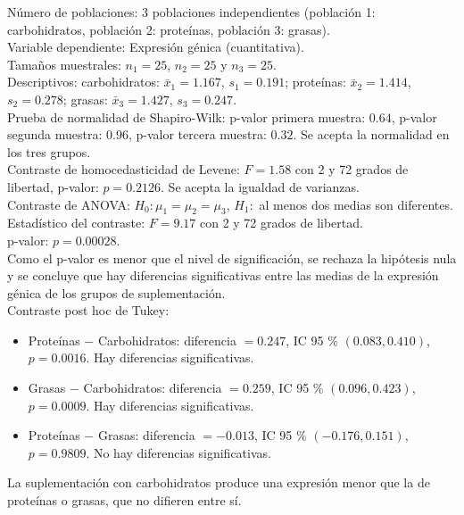 \documentclass[
  spanish,
  a4paper,
]{scrreport}
\providecommand{\tightlist}{%
  \setlength{\itemsep}{0pt}\setlength{\parskip}{0pt}}
\theoremstyle{definition}
\theoremstyle{remark}
\begin{document}
\begin{tcolorbox}[enhanced jigsaw, arc=.35mm, bottomrule=.15mm, bottomtitle=1mm, breakable, colback=white, colbacktitle=quarto-callout-tip-color!10!white, colframe=quarto-callout-tip-color-frame, coltitle=black, left=2mm, leftrule=.75mm, opacityback=0, opacitybacktitle=0.6, rightrule=.15mm, title=\textcolor{quarto-callout-tip-color}{\faLightbulb}\hspace{0.5em}{Solución}, titlerule=0mm, toprule=.15mm, toptitle=1mm]

Número de poblaciones: 3 poblaciones independientes (población 1:
carbohidratos, población 2: proteínas, población 3: grasas).\\
Variable dependiente: Expresión génica (cuantitativa).\\
Tamaños muestrales: \(n_1=25\), \(n_2=25\) y \(n_3=25\).\\
Descriptivos: carbohidratos: \(\bar x_1=1.167\), \(s_1=0.191\);
proteínas: \(\bar x_2=1.414\), \(s_2=0.278\); grasas:
\(\bar x_3=1.427\), \(s_3=0.247\).\\
Prueba de normalidad de Shapiro-Wilk: p-valor primera muestra: \(0.64\),
p-valor segunda muestra: \(0.96\), p-valor tercera muestra: \(0.32\). Se
acepta la normalidad en los tres grupos.\\
Contraste de homocedasticidad de Levene: \(F=1.58\) con 2 y 72 grados de
libertad, p-valor: \(p=0.2126\). Se acepta la igualdad de varianzas.\\
Contraste de ANOVA: \(H_0:\mu_1=\mu_2=\mu_3\), \(H_1:\) al menos dos
medias son diferentes.\\
Estadístico del contraste: \(F=9.17\) con 2 y 72 grados de libertad.\\
p-valor: \(p=0.00028\).\\
Como el p-valor es menor que el nivel de significación, se rechaza la
hipótesis nula y se concluye que hay diferencias significativas entre
las medias de la expresión génica de los grupos de suplementación.\\
Contraste post hoc de Tukey:

\begin{itemize}
\tightlist
\item
  Proteínas \(-\) Carbohidratos: diferencia \(=0.247\), IC 95 \%
  \((0.083, 0.410)\), \(p=0.0016\). Hay diferencias significativas.\\
\item
  Grasas \(-\) Carbohidratos: diferencia \(=0.259\), IC 95 \%
  \((0.096, 0.423)\), \(p=0.0009\). Hay diferencias significativas.\\
\item
  Proteínas \(-\) Grasas: diferencia \(=-0.013\), IC 95 \%
  \((-0.176, 0.151)\), \(p=0.9809\). No hay diferencias significativas.
\end{itemize}

La suplementación con carbohidratos produce una expresión menor que la
de proteínas o grasas, que no difieren entre sí.

\end{tcolorbox}
\end{document}
